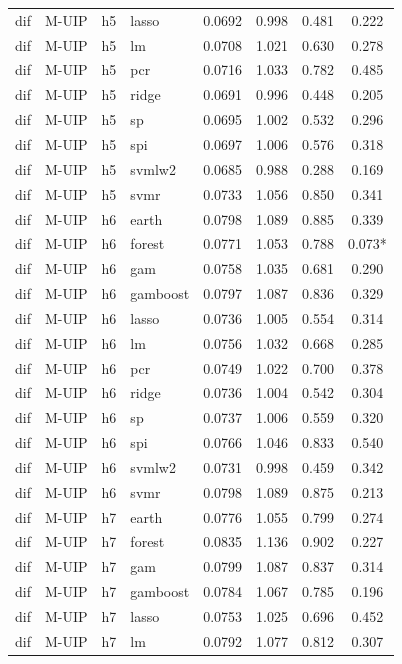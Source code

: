 \begin{ThreePartTable}
\begin{longtable}[t]{llclcccc}
dif & M-UIP & h5 & lasso & 0.0692 & 0.998 & 0.481 & 0.222\\
dif & M-UIP & h5 & lm & 0.0708 & 1.021 & 0.630 & 0.278\\
dif & M-UIP & h5 & pcr & 0.0716 & 1.033 & 0.782 & 0.485\\
dif & M-UIP & h5 & ridge & 0.0691 & 0.996 & 0.448 & 0.205\\
dif & M-UIP & h5 & sp & 0.0695 & 1.002 & 0.532 & 0.296\\
dif & M-UIP & h5 & spi & 0.0697 & 1.006 & 0.576 & 0.318\\
dif & M-UIP & h5 & svmlw2 & 0.0685 & 0.988 & 0.288 & 0.169\\
dif & M-UIP & h5 & svmr & 0.0733 & 1.056 & 0.850 & 0.341\\
\addlinespace
dif & M-UIP & h6 & earth & 0.0798 & 1.089 & 0.885 & 0.339\\
dif & M-UIP & h6 & forest & 0.0771 & 1.053 & 0.788 & 0.073*\\
dif & M-UIP & h6 & gam & 0.0758 & 1.035 & 0.681 & 0.290\\
dif & M-UIP & h6 & gamboost & 0.0797 & 1.087 & 0.836 & 0.329\\
dif & M-UIP & h6 & lasso & 0.0736 & 1.005 & 0.554 & 0.314\\
dif & M-UIP & h6 & lm & 0.0756 & 1.032 & 0.668 & 0.285\\
dif & M-UIP & h6 & pcr & 0.0749 & 1.022 & 0.700 & 0.378\\
dif & M-UIP & h6 & ridge & 0.0736 & 1.004 & 0.542 & 0.304\\
dif & M-UIP & h6 & sp & 0.0737 & 1.006 & 0.559 & 0.320\\
dif & M-UIP & h6 & spi & 0.0766 & 1.046 & 0.833 & 0.540\\
dif & M-UIP & h6 & svmlw2 & 0.0731 & 0.998 & 0.459 & 0.342\\
dif & M-UIP & h6 & svmr & 0.0798 & 1.089 & 0.875 & 0.213\\
\addlinespace
dif & M-UIP & h7 & earth & 0.0776 & 1.055 & 0.799 & 0.274\\
dif & M-UIP & h7 & forest & 0.0835 & 1.136 & 0.902 & 0.227\\
dif & M-UIP & h7 & gam & 0.0799 & 1.087 & 0.837 & 0.314\\
dif & M-UIP & h7 & gamboost & 0.0784 & 1.067 & 0.785 & 0.196\\
dif & M-UIP & h7 & lasso & 0.0753 & 1.025 & 0.696 & 0.452\\
dif & M-UIP & h7 & lm & 0.0792 & 1.077 & 0.812 & 0.307\\

\end{longtable}
\end{ThreePartTable}
